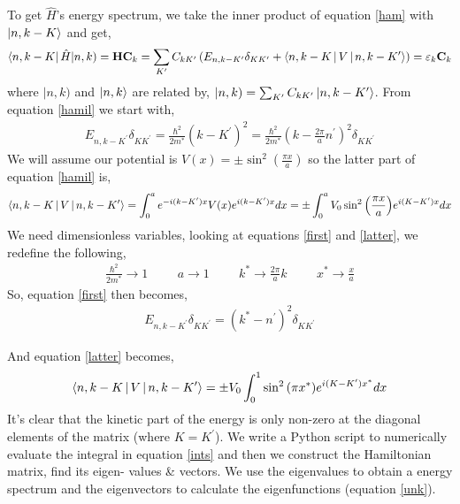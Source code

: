 \documentclass[11pt,a4paper]{article}
\begin{document}
To get $\hat{H}$'s energy spectrum, we take the inner product of equation \ref{ham} with $\ket{n,k-K}$ and get,
\begin{align}
\bra{n,k-K} \hat{H} | n,k) = \mathbf{HC}_k = \sum_{K^{\prime}} C_{kK^{\prime}} \left( E_{n,k-K^{\prime}} \delta_{KK^{\prime}} + \Braket{n,k-K|V|n,k-K^{\prime}} \right) = \varepsilon_k \mathbf{C}_k \label{hamil}
\end{align}
where $| n,k )$ and $\ket{n,k}$ are related by, $|n,k) = \sum_{K^{\prime}} C_{kK^{\prime}}\ket{n,k-K^{\prime}}$. From equation \ref{hamil} we start with,
\begin{align}
E_{n,k-K^{\prime}} \delta_{KK^{\prime}} = \frac{\hbar^2}{2m^{*}} (k-K^{\prime})^2 = \frac{\hbar^2}{2m^{*}} \left(k- \frac{2\pi }{a}n^{\prime} \right)^2 \delta_{KK^{\prime}} \label{first}
\end{align}
We will assume our potential is $V(x) = \pm \sin^2{\left( \frac{\pi x}{a}\right)}$ so the latter part of equation \ref{hamil} is,
\begin{align}
\Braket{n,k-K|V|n,k-K^{\prime}}  =  \int_0^a e^{-i(k-K^{\prime})x} V(x)  e^{i(k-K^{\prime})x} dx = \pm  \int_0^a V_0 \sin^2{\left(\frac{\pi x}{a}\right)} e^{i(K-K^{\prime})x} dx \label{latter}
\end{align}
We need dimensionless variables, looking at equations \ref{first} and \ref{latter}, we redefine the following, \\
\begin{align}
\frac{\hbar^2}{2m^{*}} \rightarrow 1 \hspace{1cm} a \rightarrow 1 \hspace{1cm} k^* \rightarrow \frac{2\pi}{a} k \hspace{1cm} x^* \rightarrow \frac{x}{a}
\end{align}
So, equation \ref{first} then becomes, 
\begin{align}
E_{n,k-K^{\prime}} \delta_{KK^{\prime}} = \left(k^*- n^{\prime} \right)^2 \delta_{KK^{\prime}} \label{diag}
\end{align}

And equation \ref{latter} becomes,
\begin{align}
\Braket{n,k-K|V|n,k-K^{\prime}}  =  \pm  V_0 \int_0^1  \sin^2{\left(\pi x^*\right)} e^{i(K-K^{\prime})x^*} dx \label{ints}
\end{align}
It's clear that the kinetic part of the energy is only non-zero at the diagonal elements of the matrix (where $K=K^{\prime}$). We write a Python script to numerically evaluate the integral in equation \ref{ints} and then we construct the Hamiltonian matrix, find its eigen- values \& vectors. We  use the eigenvalues to obtain a energy spectrum and the eigenvectors to calculate the eigenfunctions (equation \ref{unk}).
\end{document}
